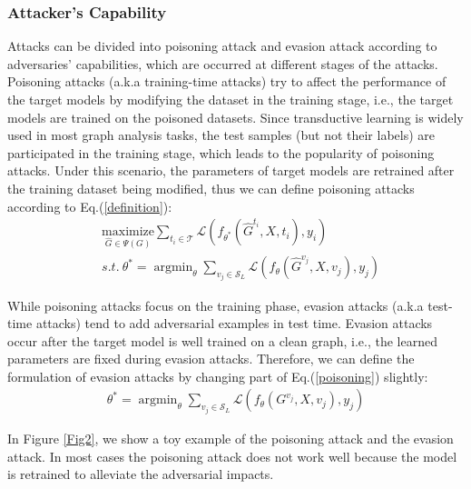 \subsubsection{Attacker's Capability}
\label{period}
Attacks can be divided into poisoning attack and evasion attack according to adversaries' capabilities, which are occurred at different stages of the attacks.
Poisoning attacks (a.k.a training-time attacks) try to affect the performance of the target models by modifying the dataset in the training stage, i.e., the target models are trained on the poisoned datasets. Since transductive learning is widely used in most graph analysis tasks, the test samples (but not their labels) are participated in the training stage, which leads to the popularity of poisoning attacks. Under this scenario, the parameters of target models are retrained after the training dataset being modified, thus we can define poisoning attacks according to Eq.(\ref{definition}):
\begin{equation}
	\label{poisoning}
	\begin{aligned}
		 & \underset{\hat{G} \in \Psi(G)} {\text{maximize}} \sum_{t_i \in \mathcal{T}} \mathcal{L}(f_{\theta^*}(\hat{G}^{t_i},X,t_i),y_i)   \\
		 & s.t. \ \theta^{\ast} = \mathop{\arg \min}_{\theta} \sum_{v_j \in \mathcal{S}_L}\mathcal{L}(f_{\theta}(\hat{G}^{v_j},X,v_j), y_j)
	\end{aligned}
\end{equation}

While poisoning attacks focus on the training phase, evasion attacks (a.k.a test-time attacks) tend to add adversarial examples in test time. Evasion attacks occur after the target model is well trained on a clean graph, i.e., the learned parameters are fixed during evasion attacks. Therefore, we can define the formulation of evasion attacks by changing part of Eq.(\ref{poisoning}) slightly:
\begin{equation}
	\begin{aligned}
		\theta^{\ast} = \mathop{\arg \min}_{\theta} \sum_{v_j \in \mathcal{S}_L}\mathcal{L}(f_{\theta}(G^{v_j},X,v_j), y_j)
	\end{aligned}
\end{equation}

In Figure \ref{Fig2}, we show a toy example of the poisoning attack and the evasion attack. In most cases the poisoning attack does not work well because the model is retrained to alleviate the adversarial impacts.

